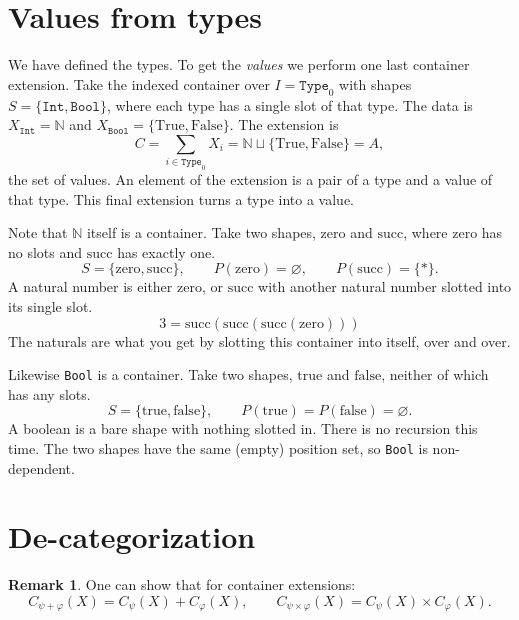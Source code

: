 \documentclass[11pt, a4paper]{article}
\theoremstyle{definition}
\newtheorem{remark}[definition]{Remark}
\theoremstyle{plain}
\begin{document}
\section{Values from types}

We have defined the types.  To get the \emph{values} we perform one
last container extension.  Take the indexed container over
$I = \texttt{Type}_0$ with shapes $S = \{\texttt{Int},
\texttt{Bool}\}$, where each type has a single slot of that type.  The data is $X_{\texttt{Int}} = \mathbb{N}$ and
$X_{\texttt{Bool}} = \{\mathrm{True}, \mathrm{False}\}$.  The
extension is
\[
  C = \sum_{i \in \texttt{Type}_0} X_i
    = \mathbb{N} \sqcup \{\mathrm{True}, \mathrm{False}\}
    = A,
\]
the set of values.  An element of the extension is a pair of a type
and a value of that type.  This final extension turns a type into a
value.

\medskip

\noindent\colorbox{gray!15}{\parbox{\dimexpr\linewidth-2\fboxsep}{%
Note that $\mathbb{N}$ itself is a container.  Take two
shapes, $\mathrm{zero}$ and $\mathrm{succ}$, where $\mathrm{zero}$
has no slots and $\mathrm{succ}$ has exactly one.
\[
  S = \{\mathrm{zero}, \mathrm{succ}\}, \qquad
  P(\mathrm{zero}) = \varnothing, \qquad
  P(\mathrm{succ}) = \{\ast\}.
\]
A natural number is either $\mathrm{zero}$, or $\mathrm{succ}$ with
another natural number slotted into its single slot.
\[
  3 = \mathrm{succ}(\mathrm{succ}(\mathrm{succ}(\mathrm{zero})))
\]
The naturals are what you get by slotting this container into
itself, over and over.

\medskip

Likewise \texttt{Bool} is a container.  Take two shapes,
$\mathrm{true}$ and $\mathrm{false}$, neither of which has any
slots.
\[
  S = \{\mathrm{true}, \mathrm{false}\},
  \qquad
  P(\mathrm{true}) = P(\mathrm{false}) = \varnothing.
\]
A boolean is a bare shape with nothing slotted in.  There is no
recursion this time.  The two shapes have the same (empty) position
set, so \texttt{Bool} is non-dependent.%
}}

\section{De-categorization}

\noindent\colorbox{blue!10}{\parbox{\dimexpr\linewidth-2\fboxsep}{%
\begin{remark}\label{rem:extension-is-sum}
One can show that for container extensions:
\[
  C_{\psi + \varphi}(X) = C_\psi(X) + C_{\varphi}(X),
  \qquad
  C_{\psi \times \varphi}(X) = C_\psi(X) \times C_{\varphi}(X).
\]
\end{remark}%
}}
\end{document}

